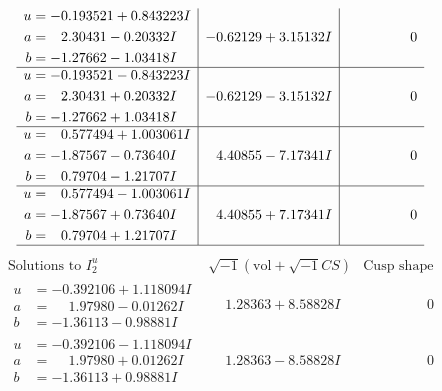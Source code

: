 \documentclass[1p]{elsarticle_modified}
\theoremstyle{definition}
\newcommand{\I}{\sqrt{-1}}
\begin{document}
$$\begin{array}{c|c|c}
\begin{aligned}
u &= -0.193521 + 0.843223 I \\
a &= \phantom{-}2.30431 - 0.20332 I \\
b &= -1.27662 - 1.03418 I\end{aligned}
 & -0.62129 + 3.15132 I & \phantom{-0.000000 } 0 \\ \hline\begin{aligned}
u &= -0.193521 - 0.843223 I \\
a &= \phantom{-}2.30431 + 0.20332 I \\
b &= -1.27662 + 1.03418 I\end{aligned}
 & -0.62129 - 3.15132 I & \phantom{-0.000000 } 0 \\ \hline\begin{aligned}
u &= \phantom{-}0.577494 + 1.003061 I \\
a &= -1.87567 - 0.73640 I \\
b &= \phantom{-}0.79704 - 1.21707 I\end{aligned}
 & \phantom{-}4.40855 - 7.17341 I & \phantom{-0.000000 } 0 \\ \hline\begin{aligned}
u &= \phantom{-}0.577494 - 1.003061 I \\
a &= -1.87567 + 0.73640 I \\
b &= \phantom{-}0.79704 + 1.21707 I\end{aligned}
 & \phantom{-}4.40855 + 7.17341 I & \phantom{-0.000000 } 0\\
 \hline 
 \end{array}$$\newpage$$\begin{array}{c|c|c}  
\text{Solutions to }I^u_{2}& \I (\text{vol} + \sqrt{-1}CS) & \text{Cusp shape}\\
 \hline 
\begin{aligned}
u &= -0.392106 + 1.118094 I \\
a &= \phantom{-}1.97980 - 0.01262 I \\
b &= -1.36113 - 0.98881 I\end{aligned}
 & \phantom{-}1.28363 + 8.58828 I & \phantom{-0.000000 } 0 \\ \hline\begin{aligned}
u &= -0.392106 - 1.118094 I \\
a &= \phantom{-}1.97980 + 0.01262 I \\
b &= -1.36113 + 0.98881 I\end{aligned}
 & \phantom{-}1.28363 - 8.58828 I & \phantom{-0.000000 } 0 \\ \hline\begin{aligned}

\end{aligned}
\end{array}$$
\end{document}
